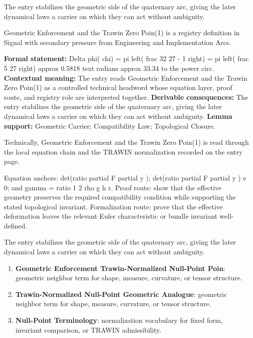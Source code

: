 The entry stabilizes the geometric side of the quaternary arc, giving the later dynamical laws a carrier on which they can act without ambiguity.
\clearpage


\begingroup\small
{}
Geometric Enforcement and the Trawin Zero Poin(1) is a registry definition in Signal with secondary pressure from Engineering and Implementation Arcs.

\begingroup\footnotesize\setlength{\emergencystretch}{3em}\sloppy
\textbf{Formal statement:} Delta phi( chi) = pi left( frac 32 27 - 1 right) = pi left( frac 5 27 right) approx 0.5818 text radians approx 33.34 to the power circ. \textbf{Contextual meaning:} The entry reads Geometric Enforcement and the Trawin Zero Poin(1) as a controlled technical headword whose equation layer, proof route, and registry role are interpreted together. \textbf{Derivable consequences:} The entry stabilizes the geometric side of the quaternary arc, giving the later dynamical laws a carrier on which they can act without ambiguity. \textbf{Lemma support:} Geometric Carrier; Compatibility Law; Topological Closure.\par
\endgroup

Technically, Geometric Enforcement and the Trawin Zero Poin(1) is read through the local equation chain and the TRAWIN normalization recorded on the entry page.

Equation anchors: det(ratio partial F partial y ); det(ratio partial F partial y ) e 0; and gamma = ratio 1 2 rho g h r. Proof route: show that the effective geometry preserves the required compatibility condition while supporting the stated topological invariant. Formalization route: prove that the effective deformation leaves the relevant Euler characteristic or bundle invariant well-defined.

The entry stabilizes the geometric side of the quaternary arc, giving the later dynamical laws a carrier on which they can act without ambiguity.
\endgroup

\begin{enumerate}[leftmargin=1.6em,itemsep=6pt,topsep=4pt]
\item \textbf{Geometric Enforcement Trawin-Normalized Null-Point Poin}: geometric neighbor term for shape, measure, curvature, or tensor structure.
\item \textbf{Trawin-Normalized Null-Point Geometric Analogue}: geometric neighbor term for shape, measure, curvature, or tensor structure.
\item \textbf{Null-Point Terminology}: normalization vocabulary for fixed form, invariant comparison, or TRAWIN admissibility.
\end{enumerate}

